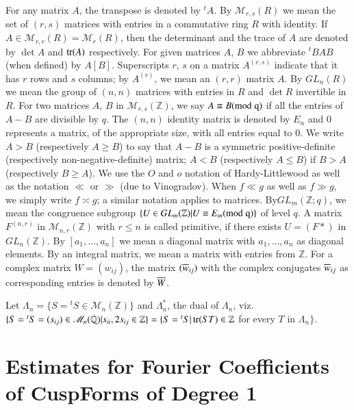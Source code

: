 For any matrix $A$, the transpose is denoted by ${}^{t}A$. By
$\mathscr{M}_{r,s}(R)$ we mean the set of $(r,s)$ matrices with
entries in a commutative ring $R$ with identity. If $A\in
\mathscr{M}_{r,r}(R)=\mathscr{M}_{r}(R)$, then the determinant and the
trace of $A$ are denoted by $\det A$ and $\operatorname{tr}(A)$ respectively. For
given matrices $A$, $B$ we abbreviate ${}^{t}BAB$ (when defined) by
$A[B]$. Superscripts $r$, $s$ on a matrix $A^{(r,s)}$ indicate that it
has $r$ rows and $s$ columns; by $A^{(r)}$, we mean an $(r,r)$ matrix
$A$. By $GL_{n}(R)$ we mean the group of $(n,n)$ matrices with entries
in $R$ and $\det R$ invertible in $R$. For two matrices $A$, $B$ in
$\mathscr{M}_{r,s}(\mathbb{Z})$, we say $A\equiv B(\rm{mod} \; q)$ if all the
entries of $A-B$ are divisible by $q$. The $(n,n)$ identity matrix is
denoted by $E_{n}$ and $0$ represents a matrix, of the appropriate
size, with all entries equal to $0$. We write $A>B$ (respectively
$A\geq B$) to say that $A-B$ is a symmetric positive-definite
(respectively non-negative-definite) matrix; $A<B$ (respectively
$A\leq B$) if $B>A$ (respectively $B\geq A$). We use the $O$ and $o$
notation of Hardy-Littlewood as well as the notation $\ll$ or $\gg$
(due to Vinogradov). When $f\ll g$ as well as $f\gg g$, we simply
write $f\asymp g$; a similar notation applies to
matrices. By\pageoriginale $GL_{m}(\mathbb{Z};q)$, we mean the
congruence subgroup $\{U\in GL_{m}(\mathbb{Z})|U\equiv E_{m}(\rm{mod} \;
q)\}$ of level $q$. A matrix $F^{(n,r)}$ in
$\mathscr{M}_{n,r}(\mathbb{Z})$ with $r\leq n$ is called primitive, if
there exists $U=(F\ast)$ in $GL_{n}(\mathbb{Z})$. By
$[a_{1},\ldots,a_{n}]$ we mean a diagonal matrix with
$a_{1},\ldots,a_{n}$ as diagonal elements. By an integral matrix, we
mean a matrix with entries from $\mathbb{Z}$. For a complex matrix
$W=(w_{ij})$, the matrix $(\overline{w}_{ij})$ with the complex conjugates
$\overline{w}_{ij}$ as corresponding entries is denoted by $\overline{W}$.

Let $\Lambda_{n}=\{S={}^{t}S\in\mathscr{M}_{n}(\mathbb{Z})\}$ and
$\Lambda^{\ast}_{n}$, the dual of $\Lambda_{n}$, viz.\@
$\{S={}^{t}S=(s_{ij})\in
\mathscr{M}_{n}(\mathbb{Q})|s_{ii},2s_{ij}\in\mathbb{Z}\}=\{S={}^{t}S|\operatorname{tr}(ST)\in\mathbb{Z}$
for every $T$ in $\Lambda_{n}\}$. 


\section[Estimates for Fourier Coefficients...]{Estimates for Fourier Coefficients of Cusp\hfil\break Forms of Degree
1}\label{c1:sec-1.1}\pageoriginale

